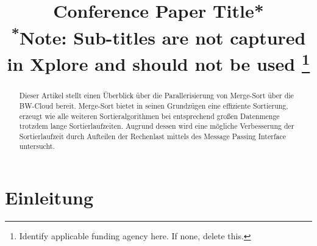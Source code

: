 \documentclass[conference]{IEEEtran}
\begin{document}
\title{Conference Paper Title*\\
{\footnotesize \textsuperscript{*}Note: Sub-titles are not captured in Xplore and
should not be used}
\thanks{Identify applicable funding agency here. If none, delete this.}
}

\author{
\and
{}
\and
{}
\and
{}
}

\maketitle

\begin{abstract}
Dieser Artikel stellt einen Überblick über die Parallerisierung von Merge-Sort über die BW-Cloud bereit.  Merge-Sort bietet in seinen Grundzügen eine effiziente Sortierung, erzeugt wie alle weiteren Sortieralgorithmen bei entsprechend großen Datenmenge trotzdem lange Sortierlaufzeiten. Augrund dessen wird eine mögliche Verbesserung der Sortierlaufzeit durch Aufteilen der Rechenlast mittels des Message Passing Interface untersucht.
\end{abstract}
\section{Einleitung}

\end{document}
